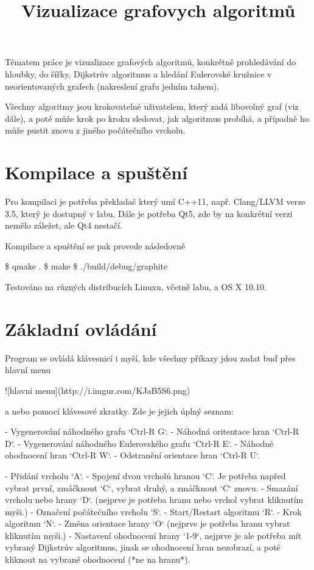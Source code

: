 \documentclass{article}
\title{Vizualizace grafovych algoritmů}
\begin{document}
Tématem práce je vizualizace grafových algoritmů, konkrétně prohledávání
do hloubky, do šířky, Dijkstrův algoritmus a hledání Eulerovské kružnice
v neorientovaných grafech (nakreslení grafu jedním tahem).

Všechny algoritmy jsou krokovatelné uživatelem, který zadá libovolný
graf (viz dále), a poté může krok po kroku sledovat, jak algoritmus
probíhá, a případně ho může pustit znovu z jiného počátečního vrcholu.

\section{Kompilace a spuštění}

Pro kompilaci je potřeba překladač který umí C++11, např. Clang/LLVM
verze 3.5, který je dostupný v labu. Dále je potřeba Qt5, zde by na
konkrétní verzi nemělo záležet, ale Qt4 nestačí.

Kompilace a spuštění se pak provede následovně

\$ qmake .
\$ make
\$ ./build/debug/graphite

Testováno na různých distribucích Linuxu, včetně labu, a OS X 10.10.

\section{Základní ovládání}

Program se ovládá klávesnicí i myší, kde všechny příkazy jdou zadat buď
přes hlavní menu

![hlavni menu](http://i.imgur.com/KJaB5S6.png)

a nebo pomocí klávesové zkratky. Zde je jejich úplný seznam:

- Vygenerování náhodného grafu `Ctrl-R G`.
- Náhodná oritentace hran `Ctrl-R D`.
- Vygenerování náhodného Eulerovského grafu `Ctrl-R E`.
- Náhodné ohodnocení hran `Ctrl-R W`.
- Odstranění orientace hran `Ctrl-R U`.

- Přidání vrcholu `A`.
- Spojení dvou vrcholů hranou `C`. Je potřeba napřed vybrat první,
zmáčknout `C`, vybrat druhý, a zmáčknout `C` znovu.
- Smazání vrcholu nebo hrany `D`. (nejprve je potřeba hranu nebo vrchol vybrat kliknutím myši.)
- Označení počátečního vrcholu `S`.
- Start/Restart algoritmu `R`.
- Krok algoritmu `N`.
- Změna orientace hrany `O` (nejprve je potřeba hranu vybrat kliknutím
myši.)
- Nastavení ohodnocení hrany `1-9`, nejprve je ale potřeba mít vybraný
Dijkstrův algoritmus, jinak se ohodnocení hran nezobrazí, a poté
kliknout na vybrané ohodnocení (*ne na hranu*).
\end{document}
